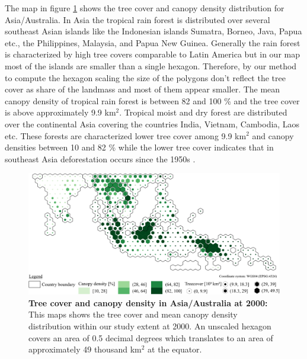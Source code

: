 			The map in figure \ref{fig:asia_tree_cover} shows the tree cover and canopy density distribution for Asia/Australia. In Asia the tropical rain forest is distributed over several southeast Asian islands like the Indonesian islands Sumatra, Borneo, Java, Papua etc., the Philippines, Malaysia, and Papua New Guinea. Generally the rain forest is characterized by high tree covers comparable to Latin America but in our map most of the islands are smaller than a single hexagon. Therefore, by our method to compute the hexagon scaling the size of the polygons don't reflect the tree cover as share of the landmass and most of them appear smaller. The mean canopy density of tropical rain forest is between 82 and 100 \% and the tree cover is above approximately 9.9 km$^2$. Tropical moist and dry forest are distributed over the continental Asia covering the countries India, Vietnam, Cambodia, Laos etc. These forests are characterized lower tree cover among 9.9 km$^2$ and canopy densities between 10 and 82 \% while the lower tree cover indicates that in southeast Asia deforestation occurs since the 1950s \citep{Kummer1994}. 
			\begin{figure}[ht]
				\centering
				\includegraphics[scale=.9]{img/asia_treecover_frameless}
				\caption[Tree cover and canopy density in Asia/Australia at 2000]{\textbf{Tree cover and canopy density in Asia/Australia at 2000:} This maps shows the tree cover and mean canopy density distribution within our study extent at 2000. An unscaled hexagon covers an area of 0.5 decimal degrees which translates to an area of approximately 49 thousand km$^2$ at the equator.}
				\label{fig:asia_tree_cover}
			\end{figure}


